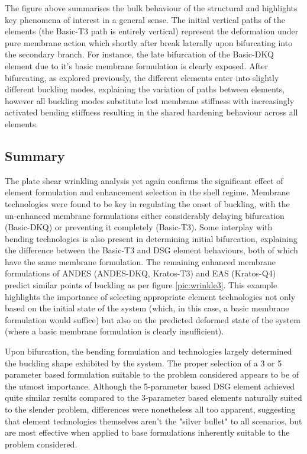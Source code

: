 The figure above summarises the bulk behaviour of the structural and highlights key phenomena of interest in a general sense. The initial vertical paths of the elements (the Basic-T3 path is entirely vertical) represent the deformation under pure membrane action which shortly after break laterally upon bifurcating into the secondary branch. For instance, the late bifurcation of the Basic-DKQ element due to it's basic membrane formulation is clearly exposed. After bifurcating, as explored previously, the different elements enter into slightly different buckling modes, explaining the variation of paths between elements, however all buckling modes substitute lost membrane stiffness with increasingly activated bending stiffness resulting in the shared hardening behaviour across all elements.

\subsection{Summary}

The plate shear wrinkling analysis yet again confirms the significant effect of element formulation and enhancement selection in the shell regime. Membrane technologies were found to be key in regulating the onset of buckling, with the un-enhanced membrane formulations either considerably delaying bifurcation (Basic-DKQ) or preventing it completely (Basic-T3). Some interplay with bending technologies is also present in determining initial bifurcation, explaining the difference between the Basic-T3 and DSG element behaviours, both of which have the same membrane formulation. The remaining enhanced membrane formulations of ANDES (ANDES-DKQ, Kratos-T3) and EAS (Kratos-Q4) predict similar points of buckling as per figure \ref{pic:wrinkle3}. This example highlights the importance of selecting appropriate element technologies not only based on the initial state of the system (which, in this case, a basic membrane formulation would suffice) but also on the predicted deformed state of the system (where a basic membrane formulation is clearly insufficient).

 Upon bifurcation, the bending formulation and technologies largely determined the buckling shape exhibited by the system. The proper selection of a 3 or 5 parameter based formulation suitable to the problem considered appears to be of the utmost importance. Although the 5-parameter based DSG element achieved quite similar results compared to the 3-parameter based elements naturally suited to the slender problem, differences were nonetheless all too apparent, suggesting that element technologies themselves aren't the "silver bullet" to all scenarios, but are most effective when applied to base formulations inherently suitable to the problem considered.
 
